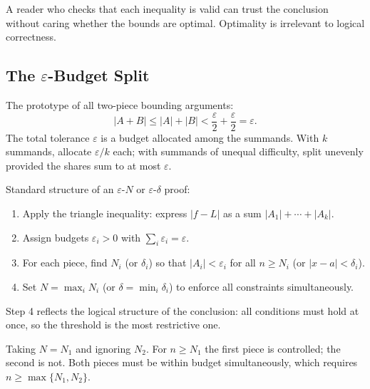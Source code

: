 \begin{remark}
A reader who checks that each inequality is valid can trust the conclusion
without caring whether the bounds are optimal. Optimality is irrelevant to
logical correctness.
\end{remark}

\subsection*{\texorpdfstring{The $\varepsilon$-Budget Split}{The epsilon-Budget Split}}
\label{subsec:budget-split}

The prototype of all two-piece bounding arguments:
\[
  |A+B|\leq|A|+|B|<\frac{\varepsilon}{2}+\frac{\varepsilon}{2}=\varepsilon.
\]
The total tolerance $\varepsilon$ is a budget allocated among the summands.
With $k$ summands, allocate $\varepsilon/k$ each; with summands of unequal
difficulty, split unevenly provided the shares sum to at most $\varepsilon$.

\begin{remark}
\label{rem:four-step}
Standard structure of an $\varepsilon$-$N$ or $\varepsilon$-$\delta$ proof:
\begin{enumerate}
  \item Apply the triangle inequality: express $|f-L|$ as a sum
        $|A_1|+\cdots+|A_k|$.
  \item Assign budgets $\varepsilon_i>0$ with $\sum_i\varepsilon_i=\varepsilon$.
  \item For each piece, find $N_i$ (or $\delta_i$) so that
        $|A_i|<\varepsilon_i$ for all $n\geq N_i$ (or $|x-a|<\delta_i$).
  \item Set $N=\max_i N_i$ (or $\delta=\min_i\delta_i$) to enforce all
        constraints simultaneously.
\end{enumerate}
Step 4 reflects the logical structure of the conclusion: all conditions must
hold at once, so the threshold is the most restrictive one.
\end{remark}

\begin{remark}
Taking $N=N_1$ and ignoring $N_2$. For $n\geq N_1$ the first piece is
controlled; the second is not. Both pieces must be within budget simultaneously,
which requires $n\geq\max\{N_1,N_2\}$.
\end{remark}




